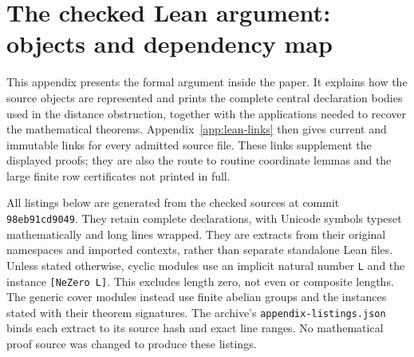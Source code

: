 \clearpage
\section{The checked Lean argument: objects and dependency map}\label{app:lean-map}

This appendix presents the formal argument inside the paper. It explains how
the source objects are represented and prints the complete central declaration
bodies used in the distance obstruction, together with the applications needed
to recover the mathematical theorems. Appendix~\ref{app:lean-links} then gives
current and immutable links for every admitted source file. These links
supplement the displayed proofs; they are also the route to routine coordinate
lemmas and the large finite row certificates not printed in full.

All listings below are generated from the checked sources at commit
\texttt{98eb91cd9049}. They retain complete declarations, with Unicode symbols
typeset mathematically and long lines wrapped. They are extracts from their
original namespaces and imported contexts, rather than separate standalone Lean
files. Unless stated otherwise, cyclic modules use an implicit natural number
\texttt{L} and the instance \texttt{[NeZero L]}. This excludes length zero, not
even or composite lengths. The generic cover modules instead use finite abelian
groups and the instances stated with their theorem signatures. The archive's
\nolinkurl{appendix-listings.json} binds each extract to its source hash and exact
line ranges. No mathematical proof source was changed to produce these listings.

